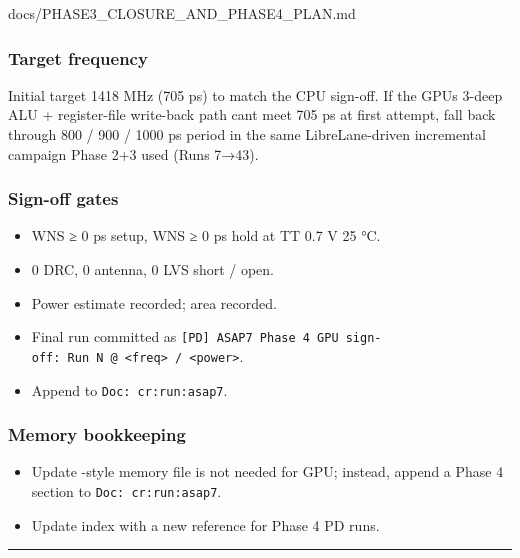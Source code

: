 \begin{relocated}{docs/PHASE3_CLOSURE_AND_PHASE4_PLAN.md}
\subsubsection{Target frequency}\label{ds:ch:phase3-closure-phase4-plan:73-target-frequency}

Initial target 1418 MHz (705 ps) to match the CPU sign-off. If the
GPU\textquotesingle s 3-deep ALU + register-file write-back path
can\textquotesingle t meet 705 ps at first attempt, fall back through
800 / 900 / 1000 ps period in the same LibreLane-driven incremental
campaign Phase 2+3 used (Runs 7→43).

\subsubsection{Sign-off gates}\label{ds:ch:phase3-closure-phase4-plan:74-sign-off-gates}

\begin{itemize}
\tightlist
\item
  WNS ≥ 0 ps setup, WNS ≥ 0 ps hold at TT 0.7 V 25 °C.
\item
  0 DRC, 0 antenna, 0 LVS short / open.
\item
  Power estimate recorded; area recorded.
\item
  Final run committed as
  \texttt{[PD]\ ASAP7\ Phase\ 4\ GPU\ sign-\allowbreak{}off:\allowbreak{}\ Run\ N\ @\ <freq>\ /\allowbreak{}\ <power>}.
\item
  Append to
  \texttt{Doc:\allowbreak{}\ cr:\allowbreak{}run:\allowbreak{}asap7}.
\end{itemize}

\subsubsection{Memory bookkeeping}\label{ds:ch:phase3-closure-phase4-plan:75-memory-bookkeeping}

\begin{itemize}
\tightlist
\item
  Update -style memory file is not needed
  for GPU; instead, append a Phase 4 section to
  \texttt{Doc:\allowbreak{}\ cr:\allowbreak{}run:\allowbreak{}asap7}.
\item
  Update  index with a new
   reference for Phase 4 PD runs.
\end{itemize}

\begin{center}\rule{0.5\linewidth}{0.5pt}\end{center}


\end{relocated}
